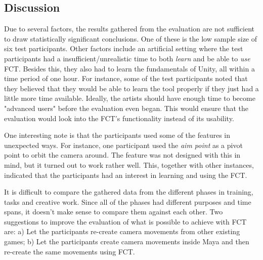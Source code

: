 \subsection{Discussion}


Due to several factors, the results gathered from the evaluation are not sufficient to draw statistically significant conclusions. One of these is the low sample size of six test participants. Other factors include an artificial setting where the test participants had a insufficient/unrealistic time to both \textit{learn} and be able to \textit{use} FCT. Besides this, they also had to learn the fundamentals of Unity, all within a time period of one hour. For instance, some of the test participants noted that they believed that they would be able to learn the tool properly if they just had a little more time available. Ideally, the artists should have enough time to become "advanced users" before the evaluation even began. This would ensure that the evaluation would look into the FCT's functionality instead of its usability.

One interesting note is that the participants used some of the features in unexpected ways. For instance, one participant used the \textit{aim point} as a pivot point to orbit the camera around. The feature was not designed with this in mind, but it turned out to work rather well. This, together with other instances, indicated that the participants had an interest in learning and using the FCT.

It is difficult to compare the gathered data from the different phases in training, tasks and creative work. Since all of the phases had different purposes and time spans, it doesn't make sense to compare them against each other. Two suggestions to improve the evaluation of what is possible to achieve with FCT are: a) Let the participants re-create camera movements from other existing games; b) Let the participants create camera movements inside Maya and then re-create the same movements using FCT.


